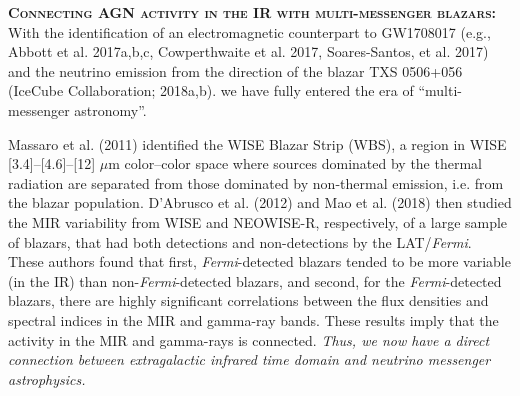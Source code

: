 \documentclass[12pt]{article}
\begin{document}
\smallskip
\smallskip
\noindent
\textbf{\textsc{Connecting AGN activity in the IR with multi-messenger blazars: }}
With the identification of an electromagnetic counterpart to GW1708017 (e.g., Abbott et
al. 2017a,b,c, Cowperthwaite et al. 2017, Soares-Santos, et
al. 2017)
and the neutrino emission from the direction of the blazar TXS 0506+056 
(IceCube Collaboration; 2018a,b).
we have  fully entered the era of ``multi-messenger astronomy''. 

\smallskip
\smallskip
\noindent
Massaro et al. (2011) identified the WISE Blazar Strip (WBS), a region in WISE [3.4]–[4.6]–[12] $\mu$m color–color space where sources dominated by the thermal radiation are separated from those dominated by non-thermal emission, i.e. from the blazar population. D'Abrusco et al. (2012) and Mao et al. (2018) then studied the MIR variability from WISE and NEOWISE-R, respectively, of a large sample of blazars, that had both detections and non-detections by the LAT/{\it Fermi}. These authors found that first, {\it Fermi}-detected blazars tended to be more variable (in the IR) than non-{\it Fermi}-detected blazars, and second, for the {\it Fermi}-detected blazars, there are highly significant correlations between the flux densities and spectral indices in the MIR and gamma-ray bands. These results imply that the activity in the MIR and gamma-rays is connected. 
{\it Thus, we now have a direct connection between extragalactic infrared time domain and neutrino messenger astrophysics.}

\end{document}
